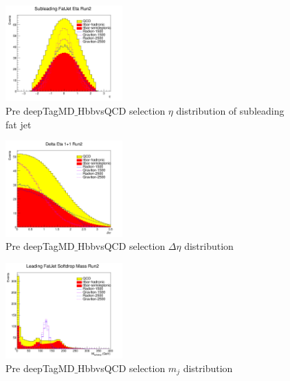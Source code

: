 \begin{figure}[!htb]
	\centering
	\includegraphics[width=0.4\textwidth]{Figures/eta1TT_Run2_deepTagMD_HbbvsQCD.png}
	\caption{Pre deepTagMD$\_$HbbvsQCD selection $\eta$ distribution of subleading fat jet}
	\label{fig:preEtasub}
\end{figure}
\begin{figure}[!htb]
	\centering
	\includegraphics[width=0.4\textwidth]{Figures/deltaEtaTT_Run2_deepTagMD_HbbvsQCD.png}
	\caption{Pre deepTagMD$\_$HbbvsQCD selection $\Delta \eta$ distribution}
	\label{fig:predeltaEta}
\end{figure}
\begin{figure}[!htb]
	\centering
	\includegraphics[width=0.4\textwidth]{Figures/msd0TT_Run2_deepTagMD_HbbvsQCD.png}
	\caption{Pre deepTagMD$\_$HbbvsQCD selection $m_{j}$ distribution}
	\label{fig:premsd0}
\end{figure}
